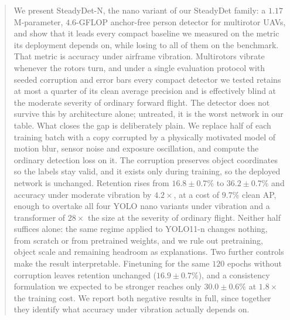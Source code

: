 \begin{abstract}
We present SteadyDet-N, the nano variant of our SteadyDet family: a
$1.17$\,M-parameter, $4.6$-GFLOP anchor-free person
detector for multirotor UAVs, and show that it leads every compact baseline we
measured on the metric its deployment depends on, while losing to all of them on
the benchmark. That metric is accuracy under airframe vibration. Multirotors
vibrate whenever the rotors turn, and under a single evaluation protocol with
seeded corruption and error bars every compact detector we tested retains at most a
quarter of its clean average precision and is effectively blind at the moderate
severity of ordinary forward flight. The detector does not survive this by
architecture alone; untreated, it is the worst network in our table. What closes
the gap is deliberately plain. We replace half of each training batch with a copy
corrupted by a physically motivated model of motion blur, sensor noise and exposure
oscillation, and compute the ordinary detection loss on it. The corruption
preserves object coordinates so the labels stay valid, and it exists only during
training, so the deployed network is unchanged. Retention rises from
$16.8 \pm 0.7\%$ to $36.2 \pm 0.7\%$ and accuracy under moderate vibration by
$4.2\times$, at a cost of $9.7\%$ clean AP, enough to overtake all four YOLO nano
variants under vibration and a transformer of $28\times$ the size at the severity
of ordinary flight. Neither half suffices alone: the same regime applied to
YOLO11-n changes nothing, from scratch or from pretrained weights, and we rule out
pretraining, object scale and remaining headroom as explanations. Two further
controls make the result interpretable. Finetuning for the same $120$ epochs
without corruption leaves retention unchanged ($16.9 \pm 0.7\%$), and a consistency
formulation we expected to be stronger reaches only $30.0 \pm 0.6\%$ at $1.8\times$
the training cost. We report both negative results in full, since together they
identify what accuracy under vibration actually depends on.
\end{abstract}


